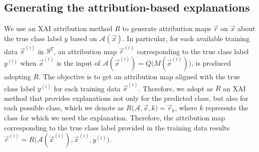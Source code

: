 \subsection{Generating the attribution-based explanations} 
\label{sec:method_genR}
We use an XAI attribution method $R$ to generate attribution maps $\vec{r}$ on $\vec{x}$ about the true class label $y$ based on $\mathcal{A}(\vec{x})$. In particular, for each available training data $\vec{x}^{(i)}$ in $S^T$, an attribution map $\vec{r}^{(i)}$ corresponding to the true class label $y^{(i)}$ when $\vec{x}^{(i)}$ is the input of $\mathcal{A}(\vec{x}^{(i)})=Q\big(M(\vec{x}^{(i)})\big)$, is produced adopting $R$. 
The objective is to get an attribution map aligned with the true class label $y^{(i)}$ for each training data $\vec{x}^{(i)}$. Therefore, we adopt as $R$ an XAI method that provides explanations not only for the predicted class, but also for each possible class, which we denote as $R\big(\mathcal{A}, \vec{x}, k \big)=\vec{r}_k$, where $k$ represents the class for which we need the explanation. Therefore, the attribution map corresponding to the true class label provided in the training data results $\vec{r}^{(i)}=R\big(\mathcal{A}(\vec{x}^{(i)}), \vec{x}^{(i)}, y^{(i)}\big)$.
